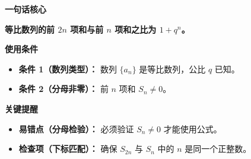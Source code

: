 \begin{summarybox}
	\textbf{\textcolor{CSummary}{一句话核心}}

	\textbf{等比数列的前 $2n$ 项和与前 $n$ 项和之比为 $1+q^n$。}

	\medskip
	\textbf{\textcolor{CSummary}{使用条件}}
	\begin{itemize}[leftmargin=*, itemsep=0.5em, topsep=0.4em]
		\item \textbf{条件 1（数列类型）：} 数列 $\{a_n\}$ 是等比数列，公比 $q$ 已知。
		\item \textbf{条件 2（分母非零）：} 前 $n$ 项和 $S_n\neq0$。
	\end{itemize}

	\medskip
	\textbf{\textcolor{CSummary}{关键提醒}}
	\begin{itemize}[leftmargin=*, itemsep=0.5em, topsep=0.4em]
		\item \textbf{易错点（分母检验）：} 必须验证 $S_n\neq0$ 才能使用公式。
		\item \textbf{检查项（下标匹配）：} 确保 $S_{2n}$ 与 $S_n$ 中的 $n$ 是同一个正整数。
	\end{itemize}
\end{summarybox}
